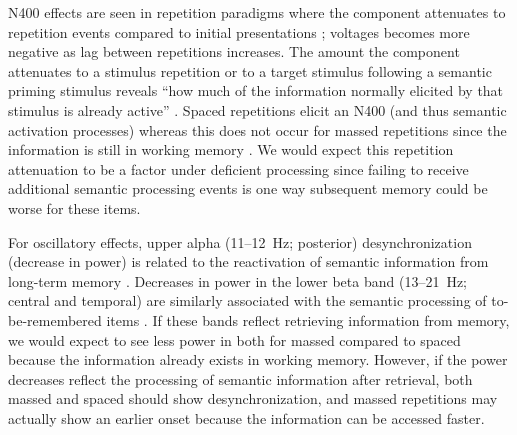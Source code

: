 N400 effects are seen in repetition paradigms where the component attenuates to repetition events compared to initial presentations \cite{KimEtal2001,OlicEtal2000,VanSEtal2007}; voltages becomes more negative as lag between repetitions increases.  The amount the component attenuates to a stimulus repetition or to a target stimulus following a semantic priming stimulus reveals ``how much of the information normally elicited by that stimulus is already active'' \cite[p.~23]{KutaFede2011}.  Spaced repetitions elicit an N400 (and thus semantic activation processes) whereas this does not occur for massed repetitions since the information is still in working memory \cite{VanSEtal2007}.  We would expect this repetition attenuation to be a factor under deficient processing since failing to receive additional semantic processing events is one way subsequent memory could be worse for these items.




For oscillatory effects, upper alpha (11--12~Hz; posterior) desynchronization (decrease in power) is related to the reactivation of semantic information from long-term memory \cite{Klim1999,KlimEtal2005}.  Decreases in power in the lower beta band (13--21~Hz; central and temporal) are similarly associated with the semantic processing of to-be-remembered items \cite{FellEtal2013,HansEtal2012,HansEtal2011a}.  If these bands reflect retrieving information from memory, we would expect to see less power in both for massed compared to spaced because the information already exists in working memory.  However, if the power decreases reflect the processing of semantic information after retrieval, both massed and spaced should show desynchronization, and massed repetitions may actually show an earlier onset because the information can be accessed faster.


